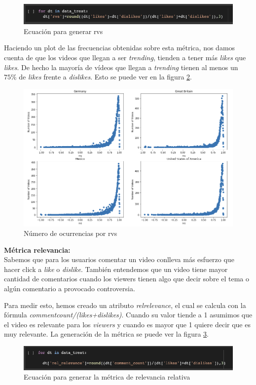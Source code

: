 \documentclass[a4paper,12pt]{article}
\begin{document}
\begin{figure}[h!]
\centering
\includegraphics[width=13cm]{rvs_gen.png}
\caption{Ecuaci\'on para generar rvs}
\label{fig:rvsform}
\end{figure}

Haciendo un plot de las frecuencias obtenidas sobre esta m\'etrica, nos damos cuenta de que los videos que llegan a ser {\itshape trending}, tienden a tener m\'as {\itshape likes} que {\itshape likes}. De hecho la mayor\'ia de v\'ideos que llegan a {\itshape trending} tienen al menos un $75\%$ de {\itshape likes} frente a {\itshape dislikes}. Esto se puede ver en la figura \ref{fig:rvsgraf}.

\begin{figure}[h!]
\centering
\includegraphics[width=14cm]{rvs_plot.png}
\caption{N\'umero de ocurrencias por rvs}
\label{fig:rvsgraf}
\end{figure}

\textbf{M\'etrica relevancia:}\\
Sabemos que para los usuarios comentar un video conlleva m\'as esfuerzo que hacer click a {\itshape like} o {\itshape dislike}. Tambi\'en entendemos que un video tiene mayor cantidad de comentarios cuando los viewers tienen algo que decir sobre el tema o alg\'un comentario a provocado controversia.

Para medir esto, hemos creado un atributo {\itshape rel{\textunderscore}relevance}, el cual se calcula con la f\'ormula {\itshape comment{\textunderscore}count/(likes+dislikes)}. Cuando su valor tiende a 1 asumimos que el video es relevante para los {\itshape viewers} y cuando es mayor que 1 quiere decir que es muy relevante. La generaci\'on de la m\'etrica se puede ver la figura \ref{fig:relfor}.
\begin{figure}[h!]
\centering
\includegraphics[width=13cm]{rel_gen.png}
\caption{Ecuaci\'on para generar la m\'etrica de relevancia relativa}
\label{fig:relfor}

\end{figure}
\end{document}
